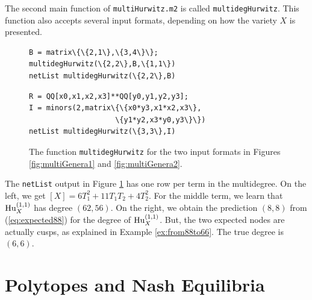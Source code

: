 \documentclass[12pt]{article}
\theoremstyle{definition}
\begin{document}
\medskip



The second main function of {\tt multiHurwitz.m2} is called {\tt multidegHurwitz}. This function also accepts several input formats, depending on how the variety $X$ is presented.


\begin{figure}[h]
\centering
\begin{minipage}{.48\textwidth}
\begin{tcolorbox}[size=fbox,width=\linewidth,colback=blue!5!white,colframe=blue!75!black]
\begin{Verbatim}[fontsize=\small,commandchars=\\\{\}]
B = matrix\{\{2,1\},\{3,4\}\};
multidegHurwitz(\{2,2\},B,\{1,1\})
netList multidegHurwitz(\{2,2\},B)
\end{Verbatim}
\end{tcolorbox}
\end{minipage}
\begin{minipage}{.48\textwidth}
\begin{tcolorbox}[size=fbox,width=\linewidth,colback=blue!5!white,colframe=blue!75!black]
\begin{Verbatim}[fontsize=\small,commandchars=\\\{\}]
R = QQ[x0,x1,x2,x3]**QQ[y0,y1,y2,y3];
I = minors(2,matrix\{\{x0*y3,x1*x2,x3\},
                    \{y1*y2,x3*y0,y3\}\})
netList multidegHurwitz(\{3,3\},I)
\end{Verbatim}
\end{tcolorbox}
\end{minipage}
\caption{The function {\tt multidegHurwitz} for the two input formats
in Figures \ref{fig:multiGenera1} and  \ref{fig:multiGenera2}.
\label{fig:multiGenera3}}
\end{figure}

\noindent The  {\tt netList} output  in Figure \ref{fig:multiGenera3}
has one row per term in the multidegree.
On the left, we get $[X] = 6 T_1^2 + 11 T_1 T_2 + 4 T_2^2$.
For the middle term, we learn that ${\rm Hu}^{(1,1)}_X$ has degree $(62,56)$.
On the right, we obtain the prediction $(8,8)$ 
from (\ref{eq:expected88}) for the degree of
${\rm Hu}^{(1,1)}_X$.  But, the two expected nodes are
actually cusps, as explained in Example \ref{ex:from88to66}.
 The true degree is~$(6,6)$.

\section{Polytopes and Nash Equilibria}
\label{sec5}
\end{document}
